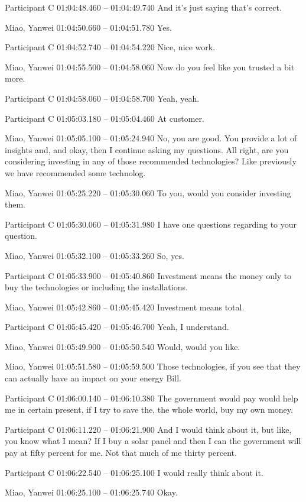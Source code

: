 {Participant C 01:04:48.460 -- 01:04:49.740
And it's just saying that's correct.

Miao, Yanwei 01:04:50.660 -- 01:04:51.780
Yes.

Participant C 01:04:52.740 -- 01:04:54.220
Nice, nice work.

Miao, Yanwei 01:04:55.500 -- 01:04:58.060
Now do you feel like you trusted a bit more.

Participant C 01:04:58.060 -- 01:04:58.700
Yeah, yeah.

Participant C 01:05:03.180 -- 01:05:04.460
At customer.

Miao, Yanwei 01:05:05.100 -- 01:05:24.940
No, you are good. You provide a lot of insights and, and okay, then I continue asking my questions. All right, are you considering investing in any of those recommended technologies? Like previously we have recommended some technolog.

Miao, Yanwei 01:05:25.220 -- 01:05:30.060
To you, would you consider investing them.

Participant C 01:05:30.060 -- 01:05:31.980
I have one questions regarding to your question.

Miao, Yanwei 01:05:32.100 -- 01:05:33.260
So, yes.

Participant C 01:05:33.900 -- 01:05:40.860
Investment means the money only to buy the technologies or including the installations.

Miao, Yanwei 01:05:42.860 -- 01:05:45.420
Investment means total.

Participant C 01:05:45.420 -- 01:05:46.700
Yeah, I understand.

Miao, Yanwei 01:05:49.900 -- 01:05:50.540
Would, would you like.

Miao, Yanwei 01:05:51.580 -- 01:05:59.500
Those technologies, if you see that they can actually have an impact on your energy Bill.

Participant C 01:06:00.140 -- 01:06:10.380
The government would pay would help me in certain present, if I try to save the, the whole world, buy my own money.

Participant C 01:06:11.220 -- 01:06:21.900
And I would think about it, but like, you know what I mean? If I buy a solar panel and then I can the government will pay at fifty percent for me. Not that much of me thirty percent.

Participant C 01:06:22.540 -- 01:06:25.100
I would really think about it.

Miao, Yanwei 01:06:25.100 -- 01:06:25.740
Okay.

}
